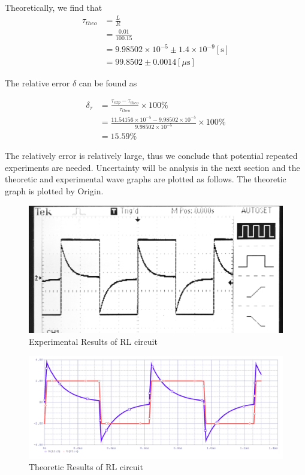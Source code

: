 \documentclass[a4paper]{article}
\begin{document}
Theoretically, we find that
\begin{align*}
	\tau_{theo}
	 & =\frac{L}{R}                                          \\
	 & =\frac{0.01}{100.15}                                  \\
	 & =9.98502\times 10^{-5}\pm 1.4\times 10^{-9}[\text{s}] \\
	 & =99.8502\pm 0.0014[\mu \text{s}]
\end{align*}

The relative error $\delta$ can be found as

\begin{align*}
	\delta_{\tau}
	 & = \frac{\tau_{exp}-\tau_{theo}}{\tau_{theo}}\times 100\%                                 \\
	 & = \frac{11.54156\times 10^{-5}-9.98502\times 10^{-5}}{9.98502\times 10^{-5}}\times 100\% \\
	 & = 15.59\%
\end{align*}

The relatively error is relatively large, thus we conclude that potential repeated experiments are needed.
Uncertainty will be analysis in the next section and the theoretic and experimental wave graphs are plotted as follows. The theoretic graph is plotted by Origin.


\begin{figure}[H]
	\center
	\includegraphics[width=12cm]{rl_exp.jpg}
	\caption{Experimental Results of RL circuit}
\end{figure}

\begin{figure}[H]
	\center
	\includegraphics[width=12cm]{rl_theo.png}
	\caption{Theoretic Results of RL circuit}
\end{figure}
\end{document}

